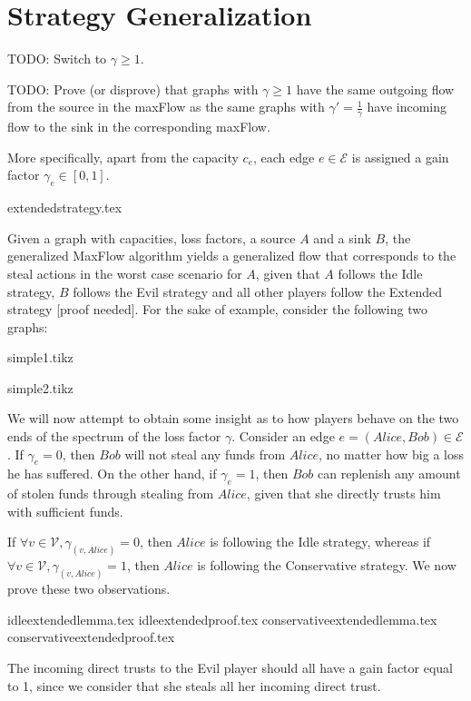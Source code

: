 \section{Strategy Generalization}
  TODO: Switch to $\gamma \geq 1$.

  TODO: Prove (or disprove) that graphs with $\gamma \geq 1$ have the same outgoing flow from the source in the maxFlow as the
  same graphs with $\gamma' = \frac{1}{\gamma}$ have incoming flow to the sink in the corresponding maxFlow.

  More specifically, apart from the capacity $c_e$, each edge $e \in \mathcal{E}$ is assigned a gain factor $\gamma_e \in
  \left[0, 1\right]$. 
  
  {extendedstrategy.tex}

  Given a graph with capacities, loss factors, a source $A$ and a sink $B$, the generalized MaxFlow algorithm yields a
  generalized flow that corresponds to the steal actions in the worst case scenario for $A$, given that $A$ follows the Idle
  strategy, $B$ follows the Evil strategy and all other players follow the Extended strategy [proof needed]. For the sake of
  example, consider the following two graphs:
  
  {simple1.tikz}

  {simple2.tikz}

  We will now attempt to obtain some insight as to how players behave on the two ends of the spectrum of the loss factor
  $\gamma$. Consider an edge $e = \left(Alice, Bob\right) \in \mathcal{E}$. If $\gamma_e = 0$, then $Bob$ will not steal any
  funds from $Alice$, no matter how big a loss he has suffered. On the other hand, if $\gamma_e = 1$, then $Bob$ can replenish
  any amount of stolen funds through stealing from $Alice$, given that she directly trusts him with sufficient funds.
  
  If $\forall v \in \mathcal{V}, \gamma_{\left(v, Alice\right)} = 0$, then $Alice$ is following the Idle strategy, whereas if
  $\forall v \in \mathcal{V}, \gamma_{\left(v, Alice\right)} = 1$, then $Alice$ is following the Conservative strategy. We now
  prove these two observations. 
  
  {idleextendedlemma.tex}
  {idleextendedproof.tex}
  {conservativeextendedlemma.tex}
  {conservativeextendedproof.tex}

  The incoming direct trusts to the Evil player should all have a gain factor equal to 1, since we consider that she steals all
  her incoming direct trust.
